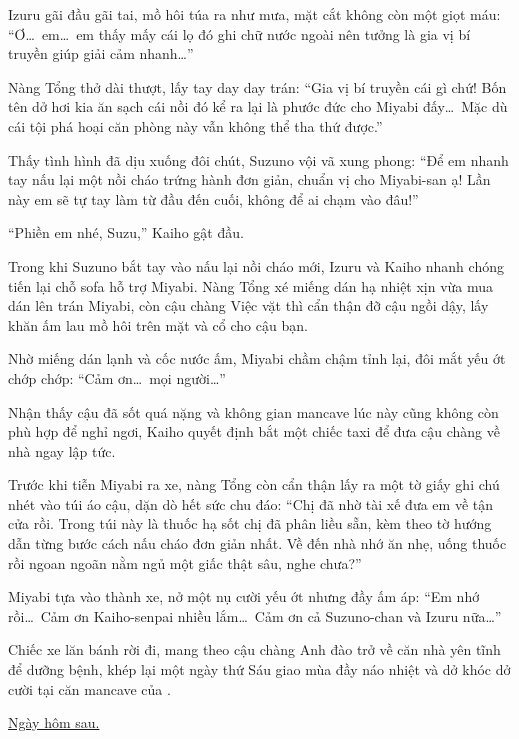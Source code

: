 \documentclass[../main.tex]{subfiles}
\begin{document}
Izuru gãi đầu gãi tai, mồ hôi túa ra như mưa, mặt cắt không còn một giọt máu: ``Ơ\dots\ em\dots\ em thấy mấy cái lọ đó ghi chữ nước ngoài nên tưởng là gia vị bí truyền giúp giải cảm nhanh\dots''

Nàng Tổng thở dài thượt, lấy tay day day trán: ``Gia vị bí truyền cái gì chứ! Bốn tên dở hơi kia ăn sạch cái nồi đó kể ra lại là phước đức cho Miyabi đấy\dots\ Mặc dù cái tội phá hoại căn phòng này vẫn không thể tha thứ được.''

Thấy tình hình đã dịu xuống đôi chút, Suzuno vội vã xung phong: ``Để em nhanh tay nấu lại một nồi cháo trứng hành đơn giản, chuẩn vị cho Miyabi-san ạ! Lần này em sẽ tự tay làm từ đầu đến cuối, không để ai chạm vào đâu!''

``Phiền em nhé, Suzu,'' Kaiho gật đầu.

Trong khi Suzuno bắt tay vào nấu lại nồi cháo mới, Izuru và Kaiho nhanh chóng tiến lại chỗ sofa hỗ trợ Miyabi. Nàng Tổng xé miếng dán hạ nhiệt xịn vừa mua dán lên trán Miyabi, còn cậu chàng Việc vặt thì cẩn thận đỡ cậu ngồi dậy, lấy khăn ấm lau mồ hôi trên mặt và cổ cho cậu bạn.

Nhờ miếng dán lạnh và cốc nước ấm, Miyabi chầm chậm tỉnh lại, đôi mắt yếu ớt chớp chớp: ``Cảm ơn\dots\ mọi người\dots''

Nhận thấy cậu đã sốt quá nặng và không gian mancave lúc này cũng không còn phù hợp để nghỉ ngơi, Kaiho quyết định bắt một chiếc taxi để đưa cậu chàng về nhà ngay lập tức.

Trước khi tiễn Miyabi ra xe, nàng Tổng còn cẩn thận lấy ra một tờ giấy ghi chú nhét vào túi áo cậu, dặn dò hết sức chu đáo: ``Chị đã nhờ tài xế đưa em về tận cửa rồi. Trong túi này là thuốc hạ sốt chị đã phân liều sẵn, kèm theo tờ hướng dẫn từng bước cách nấu cháo đơn giản nhất. Về đến nhà nhớ ăn nhẹ, uống thuốc rồi ngoan ngoãn nằm ngủ một giấc thật sâu, nghe chưa?''

Miyabi tựa vào thành xe, nở một nụ cười yếu ớt nhưng đầy ấm áp: ``Em nhớ rồi\dots\ Cảm ơn Kaiho-senpai nhiều lắm\dots\ Cảm ơn cả Suzuno-chan và Izuru nữa\dots''

Chiếc xe lăn bánh rời đi, mang theo cậu chàng Anh đào trở về căn nhà yên tĩnh để dưỡng bệnh, khép lại một ngày thứ Sáu giao mùa đầy náo nhiệt và dở khóc dở cười tại căn mancave của \hls.

\omk

\begin{center}
    \uline{Ngày hôm sau.}
\end{center}
\end{document}
